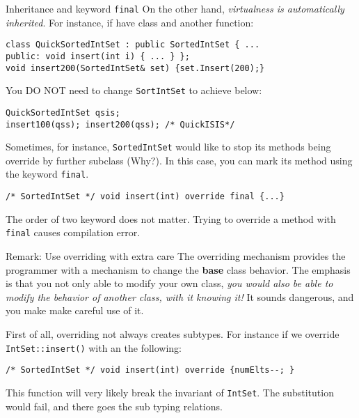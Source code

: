 \begin{frame}[fragile]{Inheritance and keyword \texttt{final}}
On the other hand, \textit{virtualness is automatically inherited}. For instance, if have class and another function:

\begin{verbatim}
class QuickSortedIntSet : public SortedIntSet { ...
public: void insert(int i) { ... } };
void insert200(SortedIntSet& set) {set.Insert(200);}
\end{verbatim}

You DO NOT need to change \texttt{SortIntSet} to achieve below:

\begin{verbatim}
QuickSortedIntSet qsis; 
insert100(qss); insert200(qss); /* QuickISIS*/
\end{verbatim}

Sometimes, for instance, \texttt{SortedIntSet} would like to stop its methods being override by further subclass (Why?). In this case, you can mark its method using the keyword \texttt{final}. 

\begin{verbatim}
/* SortedIntSet */ void insert(int) override final {...}
\end{verbatim}
The order of two keyword does not matter. Trying to override a method with \texttt{final} causes compilation error. 
\end{frame}

\begin{frame}[fragile]{Remark: Use overriding with extra care}
The overriding mechanism provides the programmer with a mechanism to change the \textbf{base} class behavior. The emphasis is that you not only able to modify your own class, \textit{you would also be able to modify the behavior of another class, with it knowing it!} It sounds dangerous, and you make make careful use of it. 

First of all, overriding not always creates subtypes. For instance if we override \texttt{IntSet::insert()} with an the following:

\begin{verbatim}
/* SortedIntSet */ void insert(int) override {numElts--; }
\end{verbatim}

This function will very likely break the invariant of \texttt{IntSet}. The substitution would fail, and there goes the sub typing relations.
\end{frame}

